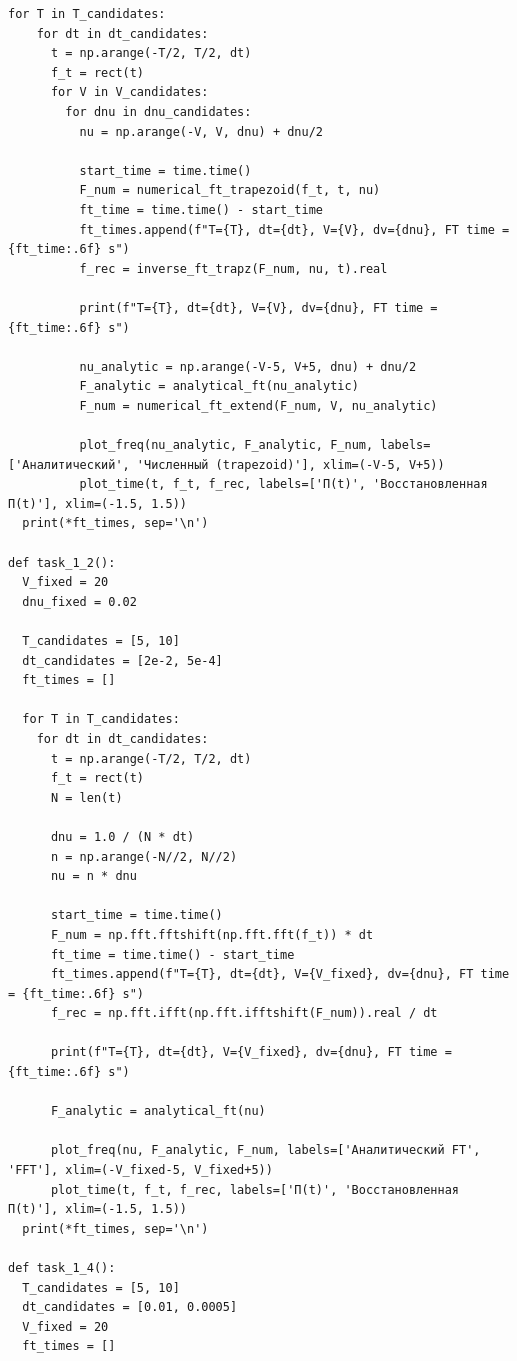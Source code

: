 \documentclass[a4paper]{article}
\begin{document}
\begin{lstlisting}[caption={Исходный код}]
  for T in T_candidates:
    for dt in dt_candidates:
      t = np.arange(-T/2, T/2, dt)
      f_t = rect(t)
      for V in V_candidates:
        for dnu in dnu_candidates:
          nu = np.arange(-V, V, dnu) + dnu/2

          start_time = time.time()
          F_num = numerical_ft_trapezoid(f_t, t, nu)
          ft_time = time.time() - start_time
          ft_times.append(f"T={T}, dt={dt}, V={V}, dv={dnu}, FT time = {ft_time:.6f} s")
          f_rec = inverse_ft_trapz(F_num, nu, t).real

          print(f"T={T}, dt={dt}, V={V}, dv={dnu}, FT time = {ft_time:.6f} s")

          nu_analytic = np.arange(-V-5, V+5, dnu) + dnu/2
          F_analytic = analytical_ft(nu_analytic)
          F_num = numerical_ft_extend(F_num, V, nu_analytic)

          plot_freq(nu_analytic, F_analytic, F_num, labels=['Аналитический', 'Численный (trapezoid)'], xlim=(-V-5, V+5))
          plot_time(t, f_t, f_rec, labels=['П(t)', 'Восстановленная П(t)'], xlim=(-1.5, 1.5))
  print(*ft_times, sep='\n')

def task_1_2():
  V_fixed = 20
  dnu_fixed = 0.02

  T_candidates = [5, 10]
  dt_candidates = [2e-2, 5e-4]
  ft_times = []

  for T in T_candidates:
    for dt in dt_candidates:
      t = np.arange(-T/2, T/2, dt)
      f_t = rect(t)
      N = len(t)

      dnu = 1.0 / (N * dt)
      n = np.arange(-N//2, N//2)
      nu = n * dnu

      start_time = time.time()
      F_num = np.fft.fftshift(np.fft.fft(f_t)) * dt
      ft_time = time.time() - start_time
      ft_times.append(f"T={T}, dt={dt}, V={V_fixed}, dv={dnu}, FT time = {ft_time:.6f} s")
      f_rec = np.fft.ifft(np.fft.ifftshift(F_num)).real / dt

      print(f"T={T}, dt={dt}, V={V_fixed}, dv={dnu}, FT time = {ft_time:.6f} s")

      F_analytic = analytical_ft(nu)

      plot_freq(nu, F_analytic, F_num, labels=['Аналитический FT', 'FFT'], xlim=(-V_fixed-5, V_fixed+5))
      plot_time(t, f_t, f_rec, labels=['П(t)', 'Восстановленная П(t)'], xlim=(-1.5, 1.5))
  print(*ft_times, sep='\n')

def task_1_4():
  T_candidates = [5, 10]
  dt_candidates = [0.01, 0.0005]
  V_fixed = 20
  ft_times = []


\end{lstlisting}
\end{document}
